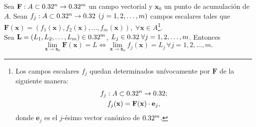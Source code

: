 \begin{propertie} \label{prop:lim_x_comp}
 Sea $\mathbf{F}: A \subset 0.32^n \to 0.32^m$ un campo vectorial y $\mathbf{x}_0$ un punto de acumulaci\'on de $A$. Sean $f_j: A \subset 0.32^n \to 0.32 \,\;(j = 1,2, \dots, m)$ campos escalares tales que $\mathbf{F}(\mathbf{x}) = \left( f_1(\mathbf{x}), f_2(\mathbf{x}), \dots, f_m(\mathbf{x}) \right),\; \forall \mathbf{x} \in A$\footnote{Los campos escalares $f_j$ quedan determinados un\'ivocamente por $\mathbf{F}$ de la siguiente manera: 
 \begin{gather*}
     f_j : A \subset 0.32^n \to 0.32; \\
     f_j(\mathbf{x}) = \mathbf{F}(\mathbf{x}) \cdot \mathbf{e}_j,
 \end{gather*} donde $\mathbf{e}_j$ es el $j$-\'esimo vector can\'onico de $0.32^m$.}.\\
 Sea $\mathbf{L} = \left( L_1, L_2, \dots, L_m \right) \in 0.32^m$, $L_j \in 0.32 \; \forall j = 1,2, \dots, m$. Entonces
 \[
  \lim_{\mathbf{x} \to \mathbf{x}_0} \mathbf{F}(\mathbf{x}) = L \iff \lim_{\mathbf{x} \to \mathbf{x}_0} f_j(\mathbf{x}) = L_j \, \forall j = 1,2, \dots, m.
 \]

\end{propertie}


